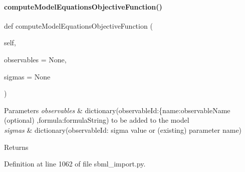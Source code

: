\paragraph{\texorpdfstring{compute\+Model\+Equations\+Objective\+Function()}{computeModelEquationsObjectiveFunction()}}
{\footnotesize\ttfamily def compute\+Model\+Equations\+Objective\+Function (\begin{DoxyParamCaption}\item[{}]{self,  }\item[{}]{observables = {\ttfamily None},  }\item[{}]{sigmas = {\ttfamily None} }\end{DoxyParamCaption})}


\begin{DoxyParams}{Parameters}
{\em observables} & dictionary(observable\+Id\+:\{\textquotesingle{}name\textquotesingle{}\+:observable\+Name (optional) ,\textquotesingle{}formula\textquotesingle{}\+:formula\+String) to be added to the model \\
\hline
{\em sigmas} & dictionary(observable\+Id\+: sigma value or (existing) parameter name)\\
\hline
\end{DoxyParams}
\begin{DoxyReturn}{Returns}

\end{DoxyReturn}


Definition at line 1062 of file sbml\+\_\+import.\+py.


